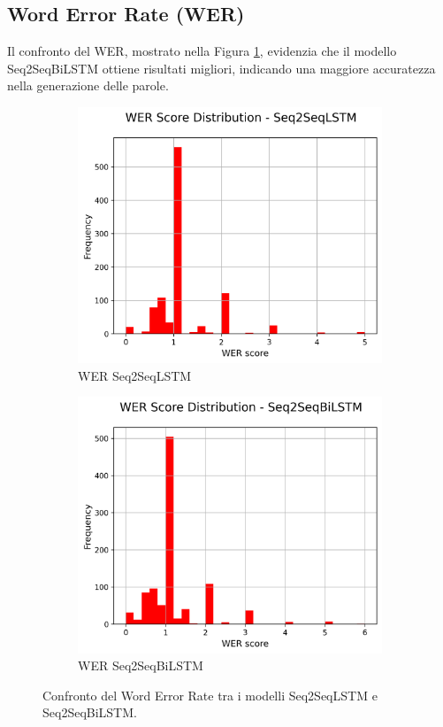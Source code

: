 \documentclass[a4paper, 12pt]{article}
\begin{document}
\subsection{Word Error Rate (WER)}
Il confronto del WER, mostrato nella Figura \ref{fig:wer_comparison}, evidenzia che il modello Seq2SeqBiLSTM ottiene risultati migliori, indicando una maggiore accuratezza nella generazione delle parole.

\begin{figure}[H]
    \centering
    \begin{subfigure}{0.45\textwidth}
        \centering
        \includegraphics[width=\textwidth]{media/Seq2SeqLSTM_wer_scores.png}
        \caption{WER Seq2SeqLSTM}
    \end{subfigure}
    \hfill
    \begin{subfigure}{0.45\textwidth}
        \centering
        \includegraphics[width=\textwidth]{media/Seq2SeqBiLSTM_wer_scores.png}
        \caption{WER Seq2SeqBiLSTM}
    \end{subfigure}
    \caption{Confronto del Word Error Rate tra i modelli Seq2SeqLSTM e Seq2SeqBiLSTM.}
    \label{fig:wer_comparison}
\end{figure}
\end{document}
